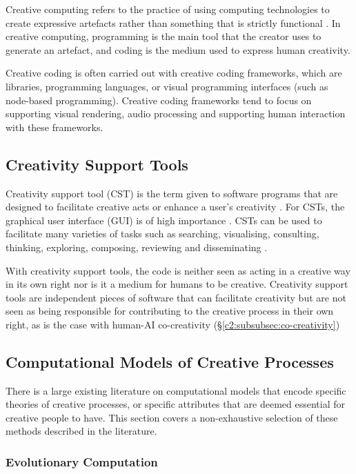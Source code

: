 Creative computing refers to the practice of using computing technologies to create expressive artefacts rather than something that is strictly functional \citep{yang2016promoting}.
In creative computing, programming is the main tool that the creator uses to generate an artefact, and coding is the medium used to express human creativity. 

Creative coding is often carried out with creative coding frameworks, which are libraries, programming languages, or visual programming interfaces (such as node-based programming). 
Creative coding frameworks tend to focus on supporting visual rendering, audio processing and supporting human interaction with these frameworks. 


\subsection{Creativity Support Tools}
\label{c2:subsec:cst}

Creativity support tool (CST) is the term given to software programs that are designed to facilitate creative acts or enhance a user's creativity \citep{shneiderman2002creativity}. 
For CSTs, the graphical user interface (GUI) is of high importance \citep{shneiderman1999user}. 
CSTs can be used to facilitate many varieties of tasks such as searching, visualising, consulting, thinking, exploring, composing, reviewing and disseminating \citep{shneiderman2002cst_tutorial}.

With creativity support tools, the code is neither seen as acting in a creative way in its own right nor is it a medium for humans to be creative. 
Creativity support tools are independent pieces of software that can facilitate creativity but are not seen as being responsible for contributing to the creative process in their own right, as is the case with human-AI co-creativity (\S \ref{c2:subsubsec:co-creativity})

\subsection{Computational Models of Creative Processes}

There is a large existing literature on computational models that encode specific theories of creative processes, or specific attributes that are deemed essential for creative people to have.
This section covers a non-exhaustive selection of these methods described in the literature.

\subsubsection{Evolutionary Computation}

